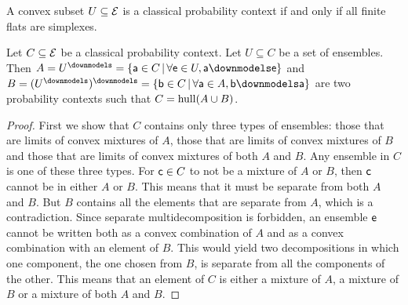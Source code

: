 \begin{mathSection}
\begin{conj}
	A convex subset $U \subseteq \Ens$ is a classical probability context if and only if all finite flats are simplexes.
\end{conj}

\begin{prop}
	Let $C \subseteq \Ens$ be a classical probability context. Let $U \subseteq C$ be a set of ensembles. Then $A=U^\separate=\{ \ens[a] \in C \, | \, \forall \ens \in U, \ens[a] \separate \ens \}$ and $B=(U^\separate)^\separate=\{ \ens[b] \in C \, | \, \forall \ens[a] \in A, \ens[b] \separate \ens[a] \}$ are two probability contexts such that $C = \hull(A \cup B)$.
\end{prop}

\begin{proof}
	First we show that $C$ contains only three types of ensembles: those that are limits of convex mixtures of $A$, those that are limits of convex mixtures of $B$ and those that are limits of convex mixtures of both $A$ and $B$. Any ensemble in $C$ is one of these three types. For $\ens[c] \in C$ to not be a mixture of $A$ or $B$, then $\ens[c]$ cannot be in either $A$ or $B$. This means that it must be separate from both $A$ and $B$. But $B$ contains all the elements that are separate from $A$, which is a contradiction. Since separate multidecomposition is forbidden, an ensemble $\ens$ cannot be written both as a convex combination of $A$ and as a convex combination with an element of $B$. This would yield two decompositions in which one component, the one chosen from $B$, is separate from all the components of the other. This means that an element of $C$ is either a mixture of $A$, a mixture of $B$ or a mixture of both $A$ and $B$.
	

\end{proof}
\end{mathSection}

